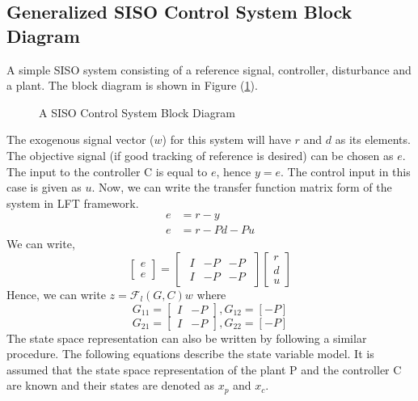 \documentclass[a4paper,12pt]{article}
\begin{document}
			\subsection{Generalized SISO Control System Block Diagram} A simple SISO system consisting of a reference signal, controller, disturbance and a plant. The block diagram is shown in Figure (\ref{simple_siso}).
				\begin{figure}[H]
 
			  \centering
			  
			  
			  \caption{A SISO Control System Block Diagram}
			 \label{simple_siso}
		\end{figure}
			 The exogenous signal vector ($w$) for this system will have $r$ and $d$ as its elements. The objective signal (if good tracking of reference is desired) can be chosen as $e$. The input to the controller C is equal to $e$, hence $y=e$. The control input in this case is given as $u$. Now, we can write the transfer function matrix form of the system in LFT framework. 
				\begin{align}
					e&=r-y\\
					e&=r-Pd-Pu
				\end{align}	
				We can write,
				\[
				\begin{bmatrix}
				e\\ \hline e 
				\end{bmatrix}				
				=
				\begin{bmatrix}
				\begin{array}{cc|c}
				I & -P & -P\\
				\hline
				I & -P & -P
				\end{array}
				\end{bmatrix}
				\begin{bmatrix}
				r\\d\\ \hline u
				\end{bmatrix}
				\]
				Hence, we can write $z=\mathscr{F}_{l}(G,C)w$ where \[G_{11} =\begin{bmatrix}
				I & -P
				\end{bmatrix}, G_{12}=[-P]\] \[G_{21} =\begin{bmatrix}
				I & -P
				\end{bmatrix}, G_{22}=[-P]\] 
				The state space representation can also be written by following a similar procedure. The following equations describe the state variable model. It is assumed that the state space representation of the plant P and the controller C are known and their states are denoted as $x_{p}$ and $x_{c}$.
\end{document}
